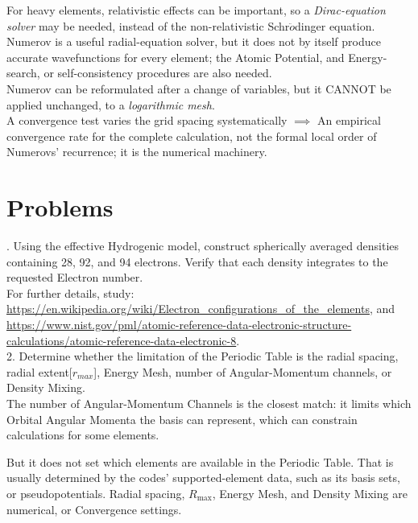 \documentclass[a4paper, 10pt, onepage]{elegantbook}
\begin{document}
For heavy elements, relativistic effects can be important, so a \emph{Dirac-equation solver} may be needed, instead of the non-relativistic Schr$\ddot{o}$dinger equation. Numerov is a useful radial-equation solver, but it does not by itself produce accurate wavefunctions for every element; the Atomic Potential, and Energy-search, or self-consistency procedures are also needed.  \\

Numerov can be reformulated after a change of variables, but it CANNOT be applied unchanged, to a \emph{logarithmic mesh}.  \\

A convergence test varies the grid spacing systematically $\implies$ An empirical convergence rate for the complete calculation, not the formal local order of Numerovs' recurrence; it is the numerical machinery.

\newpage

\chapter{Problems}
. Using the effective Hydrogenic model, construct spherically averaged densities containing 28, 92, and 94 electrons. Verify that each density integrates to the requested Electron number. \\

For further details, study: \\
\url{https://en.wikipedia.org/wiki/Electron_configurations_of_the_elements}, 
and  \\
\url{https://www.nist.gov/pml/atomic-reference-data-electronic-structure-calculations/atomic-reference-data-electronic-8}.  \\  

2. Determine whether the limitation of the Periodic Table is the radial spacing, radial extent[$r_{max}$], Energy Mesh, number of Angular-Momentum channels, or Density Mixing.  \\

The number of Angular-Momentum Channels is the closest match: it limits which Orbital Angular Momenta the basis can represent, which can constrain calculations for some elements.

But it does not set which elements are available in the Periodic Table. That is usually determined by the codes' supported-element data, such as its basis sets, or pseudopotentials. Radial spacing, $R_{\max}$, Energy Mesh, and Density Mixing are numerical, or Convergence settings.
\end{document}
